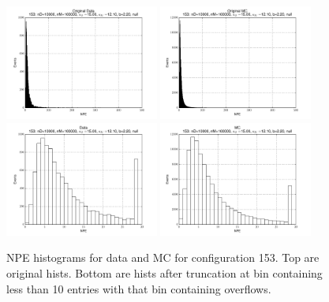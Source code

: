  \begin{figure}[htbp] \begin{center} 
\includegraphics[width=0.45\textwidth]{../FIGURES/153/FIG_Original_Data.pdf} 
\includegraphics[width=0.45\textwidth]{../FIGURES/153/FIG_Original_MC.pdf} 
\includegraphics[width=0.45\textwidth]{../FIGURES/153/FIG_Data.pdf} 
\includegraphics[width=0.45\textwidth]{../FIGURES/153/FIG_MC.pdf} 
\caption{NPE histograms for data and MC for configuration 153. Top are original hists. Bottom are hists after truncation at bin containing less than 10 entries with that bin containing overflows.} 
\label{tab:npe_153} 
\end{center} \end{figure} 
\clearpage
 